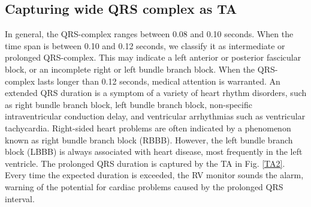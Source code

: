 \begin{figure}
\begin{adjustbox}{width=\linewidth}
\begin{tikzpicture}[->,shorten >=1pt,auto,node distance=2.5cm,semithick,initial where=left]
		\end{tikzpicture}
	\end{adjustbox}
	\caption{}
	\label{fig:TA1}
\end{figure}


\subsection{ Capturing wide QRS complex as TA}

In general, the QRS-complex ranges between 0.08 and 0.10 seconds. When the time span is between 0.10 and 0.12 seconds, we
classify it as intermediate or prolonged QRS-complex. This may
indicate a left anterior or posterior fascicular block, or an incomplete right or left bundle branch block. When the QRS-complex
lasts longer than 0.12 seconds, medical attention is warranted. An
extended QRS duration is a symptom of a variety of heart rhythm
disorders, such as right bundle branch block, left bundle branch
block, non-specific intraventricular conduction delay, and ventricular arrhythmias such as ventricular tachycardia. Right-sided heart
problems are often indicated by a phenomenon known as right bundle branch block (RBBB). However, the left bundle branch block
(LBBB) is always associated with heart disease, most frequently
in the left ventricle. The prolonged QRS duration is captured by
the TA in Fig. \ref{TA2}. Every time the expected duration is exceeded, the
RV monitor sounds the alarm, warning of the potential for cardiac
problems caused by the prolonged QRS interval.

